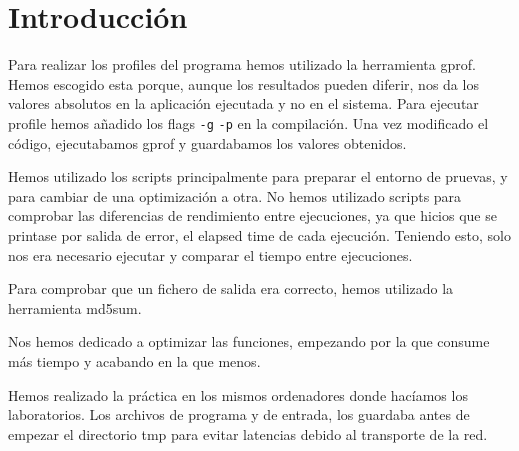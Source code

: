 \section{Introducci\'{o}n}

Para realizar los profiles del programa hemos utilizado la herramienta gprof.
Hemos escogido esta porque, aunque los resultados pueden diferir, nos da los
valores absolutos en la aplicaci\'{o}n ejecutada y no en el sistema. Para
ejecutar profile hemos a\~{n}adido los flags \texttt{-g} \texttt{-p} en la compilaci\'{o}n. Una vez
modificado el c\'{o}digo, ejecutabamos gprof y guardabamos los valores obtenidos. 

Hemos utilizado los scripts principalmente para preparar el entorno de
pruevas, y para cambiar de una optimizaci\'{o}n a otra. No hemos utilizado scripts
para comprobar las diferencias de rendimiento entre ejecuciones, ya que hicios
que se printase por salida de error, el elapsed time de cada ejecuci\'{o}n.
Teniendo esto, solo nos era necesario ejecutar y comparar el tiempo entre ejecuciones.

Para comprobar que un fichero de salida era correcto, hemos utilizado la
herramienta md5sum. 

Nos hemos dedicado a optimizar las funciones, empezando por la que consume m\'{a}s
tiempo y acabando en la que menos.

Hemos realizado la pr\'{a}ctica en los mismos ordenadores donde hac\'{i}amos los
laboratorios. Los archivos de programa y de entrada, los guardaba antes de
empezar el directorio tmp para evitar latencias debido al transporte de la
red.

